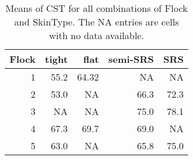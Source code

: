 \begin{table}[ht]
\centering
\label{tab:fxst}
\caption{Means of CST for all combinations of Flock and SkinType. The NA entries are cells with no data available.}
\vspace{0.1in}
\begin{tabular}{|r|rrrr|}
  \hline
Flock & tight & flat & semi-SRS  & SRS \\ 
  \hline
1 & 55.2 & 64.32 & NA & NA  \\
2 & 53.0 & NA & 66.3 & 72.3 \\
3 &  NA & NA & 75.0 & 78.1 \\
4 & 67.3 & 69.7 & 69.0 & NA \\
5 & 63.0 & NA & 65.8 & 75.0 \\
   \hline
\end{tabular}
\end{table}

